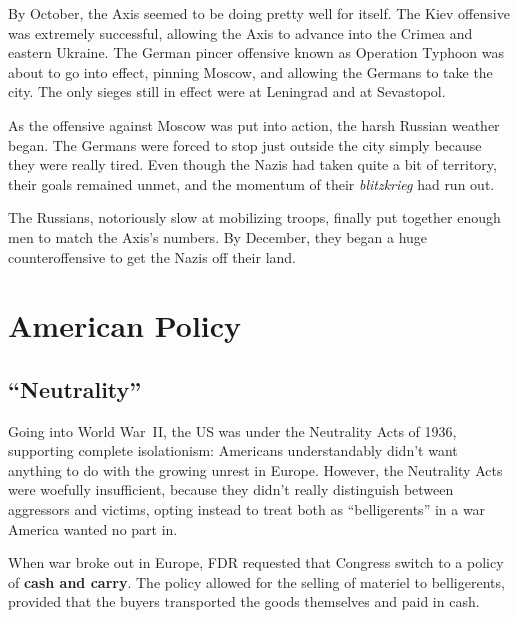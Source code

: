 By October, the Axis seemed to be doing pretty well for itself.
The Kiev offensive was extremely successful, allowing the Axis to advance into the Crimea and eastern Ukraine.
The German pincer offensive known as Operation Typhoon was about to go into effect, pinning Moscow,
and allowing the Germans to take the city.
The only sieges still in effect were at Leningrad and at Sevastopol.

As the offensive against Moscow was put into action, the harsh Russian weather began.
The Germans were forced to stop just outside the city simply because they were really tired.
Even though the Nazis had taken quite a bit of territory,
their goals remained unmet, and the momentum of their \textit{blitzkrieg} had run out.

The Russians, notoriously slow at mobilizing troops, finally put together enough men to match the Axis's numbers.
By December, they began a huge counteroffensive to get the Nazis off their land.

\section{American Policy}

\subsection*{``Neutrality''}

Going into World War~II, the US was under the Neutrality Acts of 1936, supporting complete isolationism:
Americans understandably didn't want anything to do with the growing unrest in Europe.
However, the Neutrality Acts were woefully insufficient,
because they didn't really distinguish between aggressors and victims,
opting instead to treat both as ``belligerents'' in a war America wanted no part in.

When war broke out in Europe, FDR requested that Congress switch to a policy of \textbf{cash and carry}.
The policy allowed for the selling of materiel to belligerents,
provided that the buyers transported the goods themselves and paid in cash.

